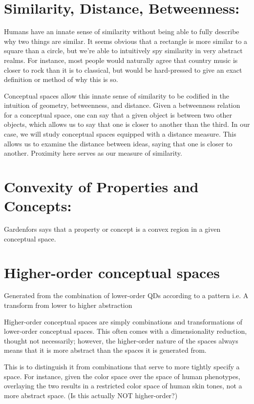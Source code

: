 \section{Similarity, Distance, Betweenness:}
Humans have an innate sense of similarity without being able to fully describe why two things are similar.  It seems obvious that a rectangle is more similar to a square than a circle, but we're able to intuitively spy similarity in very abstract realms.  For instance, most people would naturally agree that country music is closer to rock than it is to classical, but would be hard-pressed to give an exact definition or method of why this is so.

Conceptual spaces allow this innate sense of similarity to be codified in the intuition of geometry, betweenness, and distance.  Given a betweenness relation for a conceptual space, one can say that a given object is between two other objects, which allows us to say that one is closer to another than the third.  In our case, we will study conceptual spaces equipped with a distance measure.  This allows us to examine the distance between ideas, saying that one is closer to another.  Proximity here serves as our measure of similarity.

\section{Convexity of Properties and Concepts:}
Gardenfors says that a property or concept is a convex region in a given conceptual space.

\section{Higher-order conceptual spaces}
Generated from the combination of lower-order QDs according to a pattern
i.e. A transform from lower to higher abstraction

Higher-order conceptual spaces are simply combinations and transformations of lower-order conceptual spaces.  This often comes with a dimensionality reduction, thought not necessarily; however, the higher-order nature of the spaces always means that it is more abstract than the spaces it is generated from.

This is to distinguish it from combinations that serve to more tightly specify a space.  For instance, given the color space over the space of human phenotypes, overlaying the two results in a restricted color space of human skin tones, not a more abstract space.  (Is this actually NOT higher-order?)  



